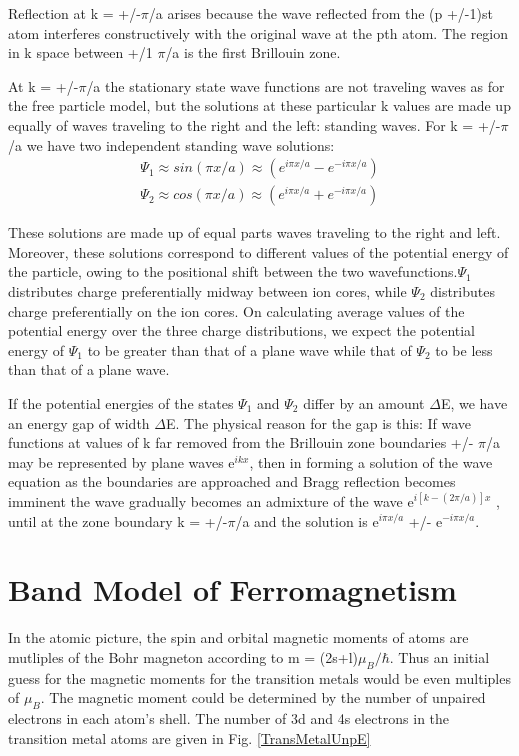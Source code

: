 Reflection at k = +/-$\pi$/a arises because the wave reflected from the (p +/-1)st atom interferes constructively with the original wave at the pth atom. The region in k space between +/1 $\pi$/a is the first Brillouin zone.

At k = +/-$\pi$/a the stationary state wave functions are not traveling waves as for the free particle model, but the solutions at these particular k values are made up equally of waves traveling to the right and the left: standing waves.  For k = +/-$\pi$/a we have two independent standing wave solutions:
\begin{equation}
\begin{split}
\Psi_1 \approx sin(\pi x/a) \approx (e^{i\pi x/a}- e^{-i\pi x /a}) \\
\Psi_2 \approx cos(\pi x/a) \approx (e^{i\pi x/a}+ e^{-i\pi x /a})
\end{split}
\end{equation}

These solutions are made up of equal parts waves traveling to the right and left. Moreover, these solutions correspond to different values of the potential energy of the particle, owing to the positional shift between the two wavefunctions.$\Psi_1$ distributes charge preferentially midway between ion cores, while $\Psi_2$ distributes charge preferentially on the ion cores. On calculating average values of the potential energy over the three charge distributions, we expect the potential energy of $\Psi_1$ to be greater than that of a plane wave while that of $\Psi_2$ to be less than that of a plane wave.

If the potential energies of the states  $\Psi_1$ and $\Psi_2$ differ by an amount $\Delta$E, we have an energy gap  of width $\Delta$E. The physical reason for the gap is this: If wave functions at values of k far removed from the Brillouin zone boundaries +/- $\pi$/a may be represented by plane waves e$^{ikx}$, then in forming a solution of the wave equation as the boundaries are approached and Bragg reflection becomes imminent the wave gradually becomes an admixture of the wave e$^{i[k-(2\pi/a)]x}$ , until at the zone boundary k = +/-$\pi$/a and the solution is e$^{i\pi x/a}$ +/- e$^{-i\pi x /a}$.

\section{Band Model of Ferromagnetism}

In the atomic picture, the spin and orbital magnetic moments of atoms are mutliples of the Bohr magneton according to m = (2s+l)$\mu_B/\hbar$. Thus an initial guess for the magnetic moments for the transition metals would be even multiples of $\mu_B$. The magnetic moment could be determined by the number of unpaired electrons in each atom's shell. The number of 3d and 4s electrons in the transition metal atoms are given in Fig. \ref{TransMetalUnpE}

